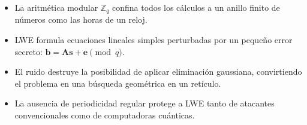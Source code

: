 \begin{resumencapitulo}
\begin{itemize}
  \item La aritmética modular $\mathbb{Z}_q$ confina todos los cálculos a un anillo finito de números como las horas de un reloj.
  \item LWE formula ecuaciones lineales simples perturbadas por un pequeño error secreto: $\mathbf{b} = \mathbf{A}\mathbf{s} + \mathbf{e} \pmod q$.
  \item El ruido destruye la posibilidad de aplicar eliminación gaussiana, convirtiendo el problema en una búsqueda geométrica en un retículo.
  \item La ausencia de periodicidad regular protege a LWE tanto de atacantes convencionales como de computadoras cuánticas.
\end{itemize}
\end{resumencapitulo}
